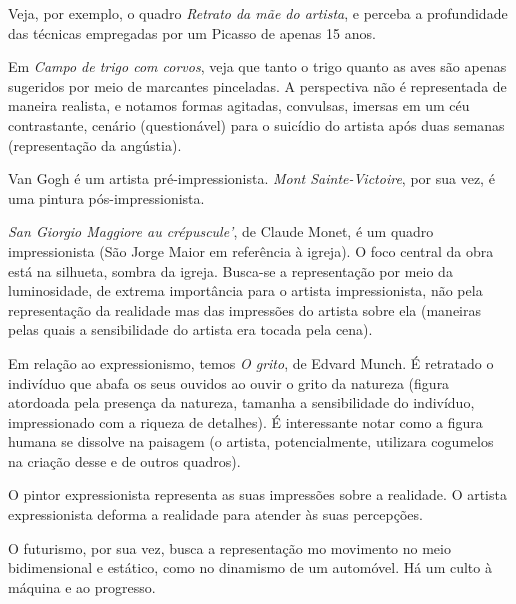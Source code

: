Veja, por exemplo, o quadro \textit{Retrato da mãe do artista}, e perceba a profundidade das técnicas empregadas por um Picasso de apenas 15 anos.

Em \textit{Campo de trigo com corvos}, veja que tanto o trigo quanto as aves são apenas sugeridos por meio de marcantes pinceladas. A perspectiva não é representada de maneira realista, e notamos formas agitadas, convulsas, imersas em um céu contrastante, cenário (questionável) para o suicídio do artista após duas semanas (representação da angústia). 

Van Gogh é um artista pré-impressionista. \textit{Mont Sainte-Victoire}, por sua vez, é uma pintura pós-impressionista.

\textit{San Giorgio Maggiore au crépuscule'}, de Claude Monet, é um quadro impressionista (São Jorge Maior em referência à igreja). O foco central da obra está na silhueta, sombra da igreja. Busca-se a representação por meio da luminosidade, de extrema importância para o artista impressionista, não pela representação da realidade mas das impressões do artista sobre ela (maneiras pelas quais a sensibilidade do artista era tocada pela cena).

Em relação ao expressionismo, temos \textit{O grito}, de Edvard Munch. É retratado o indivíduo que abafa os seus ouvidos ao ouvir o grito da natureza (figura atordoada pela presença da natureza, tamanha a sensibilidade do indivíduo, impressionado com a riqueza de detalhes). É interessante notar como a figura humana se dissolve na paisagem (o artista, potencialmente, utilizara cogumelos na criação desse e de outros quadros).

O pintor expressionista representa as suas impressões sobre a realidade. O artista expressionista deforma a realidade para atender às suas percepções.

O futurismo, por sua vez, busca a representação mo movimento no meio bidimensional e estático, como no dinamismo de um automóvel. Há um culto à máquina e ao progresso.